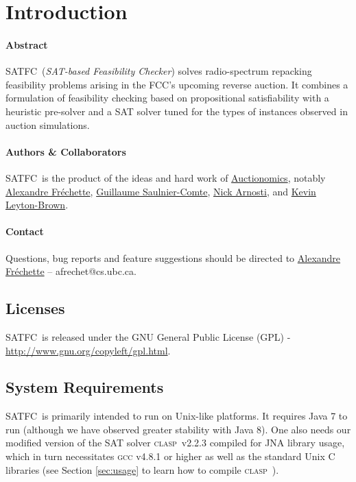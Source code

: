\documentclass[
10pt, %
letterpaper, %
oneside, %
headinclude,footinclude, %
BCOR5mm, %
needspace, %
]{scrartcl}
\newcommand{\SATFC}{\textsc{SATFC}~}
\newcommand{\clasp}{\textsc{clasp}~}
\begin{document}
\section{Introduction}

\paragraph{Abstract} \SATFC (\emph{SAT-based Feasibility Checker}) solves radio-spectrum repacking feasibility problems arising in the FCC's upcoming reverse auction. It combines a formulation of feasibility checking based on propositional satisfiability with a heuristic pre-solver and a SAT solver tuned for the types of instances observed in auction simulations.

\paragraph{Authors \& Collaborators}  \SATFC is the product of the ideas and hard work of \href{http://www.auctionomics.com/}{Auctionomics}, notably \href{http://www.cs.ubc.ca/~afrechet/}{Alexandre Fr\'echette}, \href{http://www.cs.mcgill.ca/~gsauln/}{Guillaume Saulnier-Comte}, \href{http://web.stanford.edu/~narnosti/}{Nick Arnosti}, and \href{http://www.cs.ubc.ca/~kevinlb/}{Kevin Leyton-Brown}.

\paragraph{Contact} Questions, bug reports and feature suggestions should be directed to \href{mailto:afrechet@cs.ubc.ca}{Alexandre Fr\'echette} -- afrechet@cs.ubc.ca.

\subsection{Licenses}

\SATFC is released under the GNU General Public License (GPL) - \url{http://www.gnu.org/copyleft/gpl.html}.

\subsection{System Requirements}

\SATFC is primarily intended to run on Unix-like platforms. It requires Java 7 to run (although we have observed greater stability with Java 8). One also needs our modified version of the SAT solver \clasp v2.2.3 compiled for JNA library usage, which in turn necessitates \textsc{gcc} v4.8.1 or higher as well as the standard Unix C libraries (see Section \ref{sec:usage} to learn how to compile \clasp).
\end{document}
